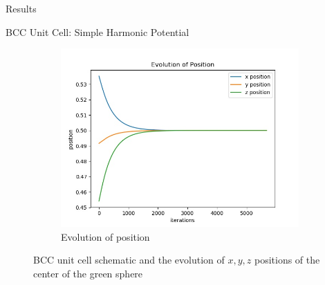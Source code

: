 \documentclass[12pt]{article}
\begin{document}
\begin{section}{Results}
\begin{subsection}{BCC Unit Cell: Simple Harmonic Potential}
\begin{figure}[h!]
\begin{subfigure}{0.5\textwidth}
        \includegraphics[width=\linewidth]{images/positionbcc.jpg}
        \caption{Evolution of position}
        \label{fig:sub2}
    \end{subfigure}
    \caption{BCC unit cell schematic and the evolution of $x,y,z$ positions of the center of the green sphere}
\end{figure}


\end{subsection}
\end{section}
\end{document}
